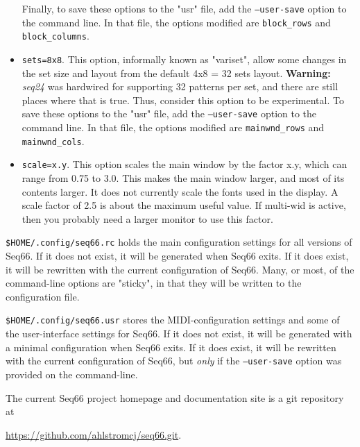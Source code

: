 \begin{itemize}
            Finally, to save these options to the "usr" file, add the
            \texttt{--user-save} option to the command line.
            In that file, the options modified are \texttt{block\_rows} and
            \texttt{block\_columns}.
         \item \texttt{sets=8x8}.
            This option, informally known as "variset", allow some changes in
            the set size and layout from the default 4x8 = 32 sets layout.
            \textbf{Warning:}
            \textsl{seq24} was hardwired for supporting 32 patterns per
            set, and there are still places where that is true.  Thus,
            consider this option to be experimental.
            To save these options to the "usr" file, add the
            \texttt{--user-save} option to the command line.
            In that file, the options modified are \texttt{mainwnd\_rows} and
            \texttt{mainwnd\_cols}.
         \item \texttt{scale=x.y}.
            This option scales the main window by the factor x.y, which can
            range from 0.75 to 3.0.  This makes the main window larger, and
            most of its contents larger.  It does not currently scale the
            fonts used in the display.  A scale factor of 2.5 is about the
            maximum useful value.  If multi-wid is active, then you probably
            need a larger monitor to use this factor.
      \end{itemize}

   \texttt{\$HOME/.config/seq66.rc} holds the main configuration settings
   for all versions of Seq66.  If it does not exist, it will be generated
   when Seq66 exits.  If it does exist, it will be rewritten with the
   current configuration of Seq66.  Many, or most, of the command-line
   options are "sticky", in that they will be written to the configuration
   file.

   \texttt{\$HOME/.config/seq66.usr} stores the MIDI-configuration
   settings and some of the user-interface settings for Seq66.  If it
   does not exist, it will be generated with a minimal configuration when
   Seq66 exits.  If it does exist, it will be rewritten with the current
   configuration of Seq66, but \textsl{only} if the
   \texttt{--user-save} option was provided on the command-line.

   The current Seq66 project homepage and documentation site
   is a git repository at

   \url{https://github.com/ahlstromcj/seq66.git}.

